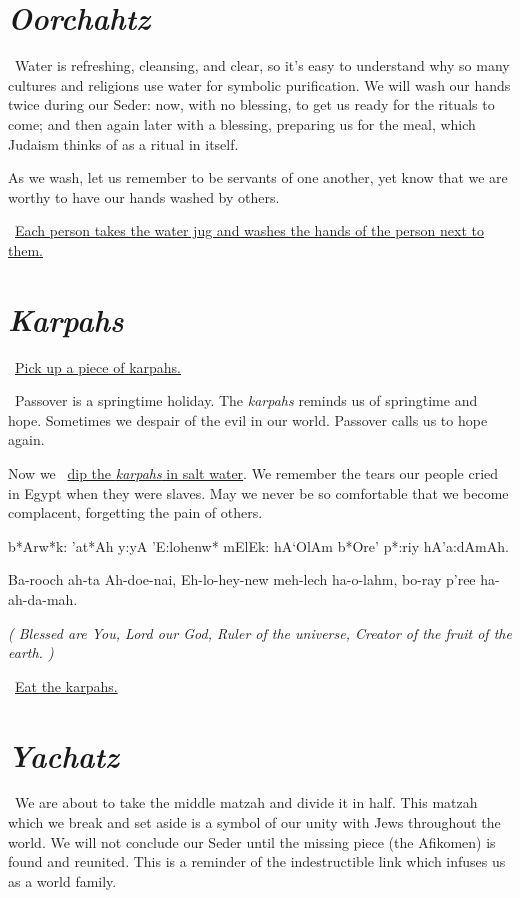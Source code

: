 \documentclass[12pt]{article}
\newenvironment{hebrewPrayer}
    {\begin{cjhebrew}
     \Large
    }
    {
    \end{cjhebrew}
    }
\newenvironment{hebrewTransliteration}{}{\par}
\newenvironment{unreadHebrewTranslation}{\itshape(\hspace{-0.2em}}{\hspace{-0.2em})\par}
\newcommand{\god}{God}
\newcommand{\hebrewVowelDotDotL}{e} %
\newcommand{\transliterateAdonai}{Ah-doe-nai}
\newcommand{\transliterateEloheinu}{Eh-lo-hey-new}
\newcommand{\baruchAdonai}{b*Arw*k: 'at*Ah y:yA}
\newcommand{\transliterateBaruchAdonai}{Ba-rooch ah-ta {\transliterateAdonai}}
\newcommand{\translateBaruchAdonai}{Blessed are You, Lord our \god}
\newcommand{\baruchHaolam}{{\baruchAdonai} 'E:loh{\hebrewVowelDotDotL}nw* mElEk: hA`OlAm}
\newcommand{\transliterateBaruchHaolam}{{\transliterateBaruchAdonai}, {\transliterateEloheinu} meh-lech ha-o-lahm}
\newcommand{\translateBaruchHaolam}{{\translateBaruchAdonai}, Ruler of the universe}
\newcommand{\stepOorchahtzEn}{Oorchahtz}
\newcommand{\stepOorchahtzHe}{Ur:.ha.s}
\newcommand{\stepKarpahsEn}{Karpahs}
\newcommand{\stepKarpahsHe}{k*ar:p*as}
\newcommand{\stepYachatzEn}{Yachatz}
\newcommand{\stepYachatzHe}{ya.ha.s}
\newcommand{\inlineSederAction}[1]{\faHandORight{}~\underline{#1}}
\newcommand{\sederAction}[1]{\inlineSederAction{#1}\par}
\newcommand{\sederSection}[2]{
    \section*{{\Huge \cjRL{#2}} \textit{#1}}
}
\newcommand{\newReading}{\faBook{}\ }
\begin{document}
\sederSection{\stepOorchahtzEn}{\stepOorchahtzHe}
\newReading Water is refreshing, cleansing, and clear, so it's easy to understand
why so many cultures and religions use water for symbolic purification.
We will wash our hands twice during our Seder: now, with no blessing, to get us ready for the rituals to come;
and then again later with a blessing, preparing us for the meal, which Judaism thinks of as a ritual in itself.

As we wash, let us remember to be servants of one another, yet know that we are worthy to have our hands washed by others.

\sederAction{Each person takes the water jug and washes the hands of the person next to them.}

\sederSection{\stepKarpahsEn}{\stepKarpahsHe}
\sederAction{Pick up a piece of karpahs.}
\newReading Passover is a springtime holiday. The \textit{karpahs} reminds us of springtime and hope. Sometimes we despair of the evil in our world. Passover calls us to hope again.
\par Now we \inlineSederAction{dip the \textit{karpahs} in salt water}. We remember the tears our people cried in Egypt when they were slaves. May we never be so comfortable that we become complacent, forgetting the pain of others.

\begin{minipage}[t]{\textwidth}
    \begin{hebrewPrayer}
        {\baruchHaolam} b*Ore' p*:riy hA'a:dAmAh\textrm{.}
    \end{hebrewPrayer}

    \begin{hebrewTransliteration}
        {\transliterateBaruchHaolam}, bo-ray p'ree ha-ah-da-mah.
    \end{hebrewTransliteration}

    \begin{unreadHebrewTranslation}
        {\translateBaruchHaolam}, Creator of the fruit of the earth.
    \end{unreadHebrewTranslation}
    \sederAction{Eat the karpahs.}
\end{minipage}

\sederSection{\stepYachatzEn}{\stepYachatzHe}
\newReading We are about to take the middle matzah and divide it in half.
This matzah which we break and set aside is a symbol of our unity with Jews throughout the world.
We will not conclude our Seder until the missing piece (the Afikomen) is found and reunited.
This is a reminder of the indestructible link which infuses us as a world family.
\end{document}

